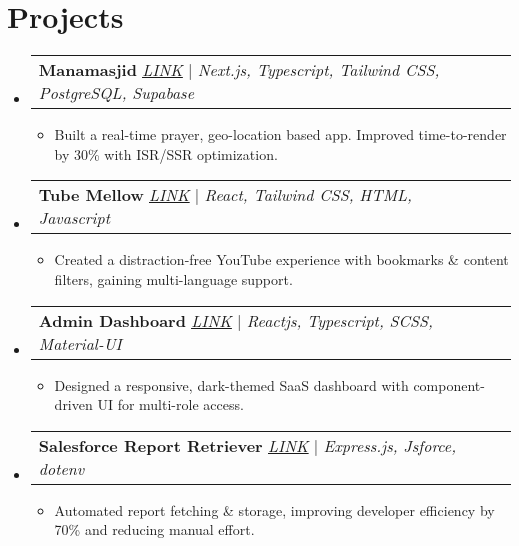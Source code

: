 \documentclass[letterpaper,11pt]{article}
\makeatletter
\newcommand{\resumeItem}[1]{
  \item\small{
    {#1 \vspace{-2pt}}
  }
}
\newcommand{\resumeProjectHeading}[2]{
    \item
    \begin{tabular*}{0.97\textwidth}{l@{\extracolsep{\fill}}r}
      \small#1 & #2 \\
    \end{tabular*}\vspace{-7pt}
}
\newcommand{\resumeSubHeadingListStart}{\begin{itemize}[leftmargin=0.15in, label={}]}
\newcommand{\resumeSubHeadingListEnd}{\end{itemize}}
\newcommand{\resumeItemListStart}{\begin{itemize}}
\newcommand{\resumeItemListEnd}{\end{itemize}\vspace{-5pt}}
\makeatother
\begin{document}
\section{Projects}
    \resumeSubHeadingListStart
     \resumeProjectHeading
          {\textbf{Manamasjid} \href{https://manamasjid.vercel.app/}{\underline{\emph{LINK}}} | \emph{Next.js, Typescript, Tailwind CSS, PostgreSQL, Supabase}}{}
          \resumeItemListStart
            \resumeItem{Built a real-time prayer, geo-location based app. Improved time-to-render by 30\% with ISR/SSR optimization.}
          \resumeItemListEnd
      \resumeProjectHeading
          {\textbf{Tube Mellow} \href{https://chromewebstore.google.com/detail/tube-mellow/fgflinjcolmfjdkilakkcgennlkhgkgh}{\underline{\emph{LINK}}} | \emph{React, Tailwind CSS, HTML, Javascript}}{}
          \resumeItemListStart
            \resumeItem{Created a distraction-free YouTube experience with bookmarks \& content filters, gaining multi-language support.}
          \resumeItemListEnd
      \resumeProjectHeading
          {\textbf{Admin Dashboard} \href{https://admin-dashboard-hakeem.vercel.app/}{\underline{\emph{LINK}}} | \emph{Reactjs, Typescript, SCSS, Material-UI}}{}
          \resumeItemListStart
            \resumeItem{Designed a responsive, dark-themed SaaS dashboard with component-driven UI for multi-role access.}
          \resumeItemListEnd
      \resumeProjectHeading
          {\textbf{Salesforce Report Retriever} \href{https://github.com/hakeemsalman/Salesforce-Report-Retriever/}{\underline{\emph{LINK}}} | \emph{Express.js, Jsforce, dotenv}}{}
          \resumeItemListStart
            \resumeItem{Automated report fetching \& storage, improving developer efficiency by 70\% and reducing manual effort.}
          \resumeItemListEnd
    \resumeSubHeadingListEnd


%
\end{document}
